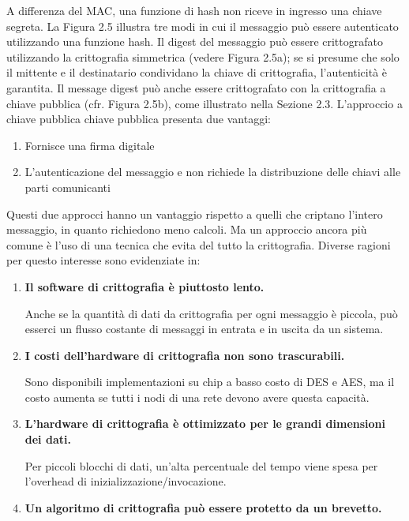 \singlespacing

A differenza del MAC, una funzione di hash non riceve in ingresso una chiave segreta. La Figura 2.5 illustra tre modi in cui il messaggio può essere autenticato utilizzando una funzione hash.
Il digest del messaggio può essere crittografato utilizzando la crittografia simmetrica (vedere Figura 2.5a); se si presume che solo il mittente e il destinatario condividano la chiave di crittografia, l'autenticità è garantita.
Il message digest può anche essere crittografato con la crittografia a chiave pubblica (cfr. Figura 2.5b), come illustrato nella Sezione 2.3. L'approccio a chiave pubblica chiave pubblica presenta due vantaggi: 

\begin{enumerate}
    \item Fornisce una firma digitale
    
    \item L'autenticazione del messaggio e non richiede la distribuzione delle chiavi alle parti comunicanti
\end{enumerate}
Questi due approcci hanno un vantaggio rispetto a quelli che criptano l'intero messaggio, in quanto richiedono meno calcoli. Ma un approccio ancora più comune è l'uso di una tecnica che evita del tutto la crittografia. Diverse ragioni per questo interesse sono evidenziate in:

\begin{enumerate}
    \item \textbf{Il software di crittografia è piuttosto lento.}
    
    Anche se la quantità di dati da crittografia per ogni messaggio è piccola, può esserci un flusso costante di messaggi in entrata e in uscita da un sistema.

    \item \textbf{I costi dell'hardware di crittografia non sono trascurabili.} 
    
    Sono disponibili implementazioni su chip a basso costo di DES e AES, ma il costo aumenta se tutti i nodi di una rete devono avere questa capacità.
    
    \item \textbf{L'hardware di crittografia è ottimizzato per le grandi dimensioni dei dati.}
    
    Per piccoli blocchi di dati, un'alta percentuale del tempo viene spesa per l'overhead di inizializzazione/invocazione.
    
    \item \textbf{Un algoritmo di crittografia può essere protetto da un brevetto.}
\end{enumerate}

